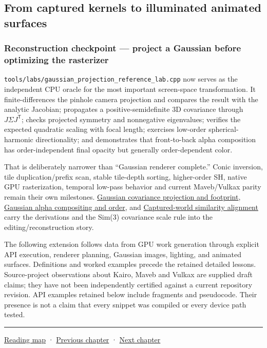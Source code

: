 \subsection{From captured kernels to illuminated animated surfaces}\label{from-captured-kernels-to-illuminated-animated-surfaces}

\subsubsection{Reconstruction checkpoint --- project a Gaussian before optimizing the rasterizer}\label{reconstruction-checkpoint-project-a-gaussian-before-optimizing-the-rasterizer}

\texttt{tools/labs/gaussian\_projection\_reference\_lab.cpp} now serves as the independent CPU oracle for the most important screen-space transformation. It finite-differences the pinhole camera projection and compares the result with the analytic Jacobian; propagates a positive-semidefinite 3D covariance through \(J\Sigma J^{\mathsf T}\); checks projected symmetry and nonnegative eigenvalues; verifies the expected quadratic scaling with focal length; exercises low-order spherical-harmonic directionality; and demonstrates that front-to-back alpha composition has order-independent final opacity but generally order-dependent color.

That is deliberately narrower than ``Gaussian renderer complete.'' Conic inversion, tile duplication/prefix scan, stable tile-depth sorting, higher-order SH, native GPU rasterization, temporal low-pass behavior and current Maveb/Vulkax parity remain their own milestones. \hyperref[appendix-24269cb6977c]{Gaussian covariance projection and footprint}, \hyperref[appendix-5f4b2e24c3f6]{Gaussian alpha compositing and order}, and \hyperref[appendix-5f40b4fea463]{Captured-world similarity alignment} carry the derivations and the Sim(3) covariance scale rule into the editing/reconstruction story.

The following extension follows data from GPU work generation through explicit API execution, renderer planning, Gaussian images, lighting, and animated surfaces. Definitions and worked examples precede the retained detailed lessons. Source-project observations about Kairo, Maveb and Vulkax are supplied draft claims; they have not been independently certified against a current repository revision. API examples retained below include fragments and pseudocode. Their presence is not a claim that every snippet was compiled or every device path tested.

\begin{center}\rule{0.5\linewidth}{0.5pt}\end{center}

\href{Chapter\%20Edition/02\%20-\%20Graphics\%20Vision\%20and\%20XR/00\%20-\%20Reading\%20Map}{Reading map} · \hyperref[04-visual-computing-ii-ch035]{Previous chapter} · \hyperref[04-visual-computing-ii-ch037]{Next chapter}
